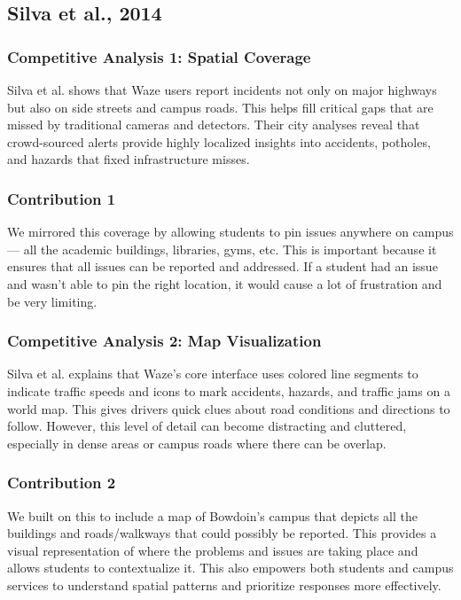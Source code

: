 \documentclass{article}
\begin{document}
\subsection{Silva et al., 2014\cite{hutchison_traffic_2013}}
\subsubsection*{Competitive Analysis 1: Spatial Coverage}

Silva et al. shows that Waze users report incidents not only on major highways but also on side streets and campus roads. This helps fill critical gaps that are missed by traditional cameras and detectors. Their city analyses reveal that crowd-sourced alerts provide highly localized insights into accidents, potholes, and hazards that fixed infrastructure misses.


\subsubsection*{Contribution 1}
We mirrored this coverage by allowing students to pin issues anywhere on campus — all the academic buildings, libraries, gyms, etc. This is important because it ensures that all issues can be reported and addressed. If a student had an issue and wasn’t able to pin the right location, it would cause a lot of frustration and be very limiting. 


\subsubsection*{Competitive Analysis 2: Map Visualization}
Silva et al. explains that Waze’s core interface uses colored line segments to indicate traffic speeds and icons to mark accidents, hazards, and traffic jams on a world map. This gives drivers quick clues about road conditions and directions to follow. However, this level of detail can become distracting and cluttered, especially in dense areas or campus roads where there can be overlap.


\subsubsection*{Contribution 2}
We built on this to include a map of Bowdoin’s campus that depicts all the buildings and roads/walkways that could possibly be reported. This provides a visual representation of where the problems and issues are taking place and allows students to contextualize it. This also empowers both students and campus services to understand spatial patterns and prioritize responses more effectively.
\end{document}
